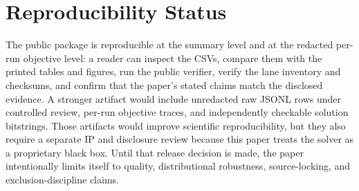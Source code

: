 \documentclass[11pt]{article}
\begin{document}
\section{Reproducibility Status}
The public package is reproducible at the summary level and at the redacted per-run objective level: a reader can inspect the CSVs, compare them with the printed tables and figures, run the public verifier, verify the lane inventory and checksums, and confirm that the paper's stated claims match the disclosed evidence. A stronger artifact would include unredacted raw JSONL rows under controlled review, per-run objective traces, and independently checkable solution bitstrings. Those artifacts would improve scientific reproducibility, but they also require a separate IP and disclosure review because this paper treats the solver as a proprietary black box. Until that release decision is made, the paper intentionally limits itself to quality, distributional robustness, source-locking, and exclusion-discipline claims.



\end{document}
